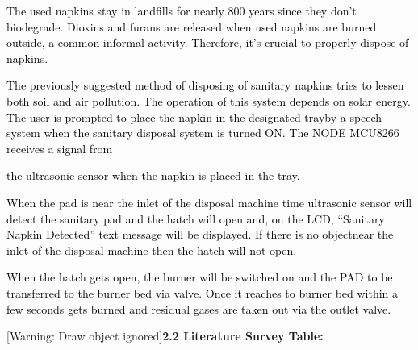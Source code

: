 \documentclass[letterpaper]{article}
\begin{document}
\textcolor{black}{The used napkins stay in landfills for nearly 800 years since they don't biodegrade. Dioxins and
furans are released when used napkins are burned outside, a common informal activity. Therefore, it's crucial to
properly dispose of napkins.}

\textcolor{black}{The previously suggested method of disposing of sanitary napkins tries to lessen both soil and air
pollution. The operation of this system depends on solar energy. The user is prompted to place the napkin in the
designated trayby a speech system when the sanitary disposal system is turned ON. The NODE MCU8266 receives a signal
from}

\textcolor{black}{the ultrasonic sensor when the napkin is placed in the tray.}

\textcolor{black}{When the pad is near the inlet of the disposal machine time ultrasonic sensor will detect the sanitary
pad and the hatch will open and, on the LCD, ``Sanitary Napkin Detected'' text message will be displayed. If there is
no objectnear the inlet of the disposal machine then the hatch will not open.}

\textcolor{black}{When the hatch gets open, the burner will be switched on and the PAD to be transferred to the burner
bed via valve. Once it reaches to burner bed within a few seconds gets burned and residual gases are taken out via the
outlet valve.}

\clearpage\setcounter{page}{1}\pagestyle{Convertedx}

[Warning: Draw object ignored]\textbf{2.2 Literature Survey Table:}


\bigskip


\bigskip
\end{document}
